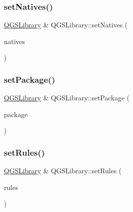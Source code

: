 \subsubsection{\texorpdfstring{set\+Natives()}{setNatives()}}
{\footnotesize\ttfamily \mbox{\hyperlink{class_q_g_s_library}{Q\+G\+S\+Library}} \& Q\+G\+S\+Library\+::set\+Natives (\begin{DoxyParamCaption}\item[{const Q\+Map$<$ Q\+String, Q\+String $>$ \&}]{natives }\end{DoxyParamCaption})}

\mbox{\label{class_q_g_s_library_a6cf4ab11fc5ba67f922029bf64dc913d}} 
\subsubsection{\texorpdfstring{set\+Package()}{setPackage()}}
{\footnotesize\ttfamily \mbox{\hyperlink{class_q_g_s_library}{Q\+G\+S\+Library}} \& Q\+G\+S\+Library\+::set\+Package (\begin{DoxyParamCaption}\item[{const Q\+String \&}]{package }\end{DoxyParamCaption})}

\mbox{\label{class_q_g_s_library_ac22dd383fc3706b061fd08f9606292fa}} 
\subsubsection{\texorpdfstring{set\+Rules()}{setRules()}}
{\footnotesize\ttfamily \mbox{\hyperlink{class_q_g_s_library}{Q\+G\+S\+Library}} \& Q\+G\+S\+Library\+::set\+Rules (\begin{DoxyParamCaption}\item[{const \mbox{\hyperlink{class_q_g_s_rules}{Q\+G\+S\+Rules}} \&}]{rules }\end{DoxyParamCaption})}

\mbox{\label{class_q_g_s_library_ad9d5ea32b24e5e38d3ad4a16f472ce9c}} 
